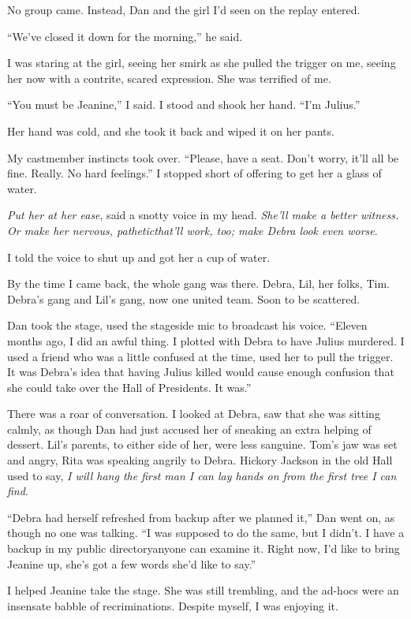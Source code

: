 No group came. Instead, Dan and the girl I'd seen on the replay
entered.

“We've closed it down for the morning,” he said.

I was staring at the girl, seeing her smirk as she pulled the
trigger on me, seeing her now with a contrite, scared expression.
She was terrified of me.

“You must be Jeanine,” I said. I stood and shook her hand. “I'm
Julius.”

Her hand was cold, and she took it back and wiped it on her pants.

My castmember instincts took over. “Please, have a seat. Don't
worry, it'll all be fine. Really. No hard feelings.” I stopped
short of offering to get her a glass of water.

\emph{Put her at her ease}, said a snotty voice in my head.
\emph{She'll make a better witness. Or make her nervous, pathetic{\dash}that'll work, too; make Debra look even worse}.

I told the voice to shut up and got her a cup of water.

By the time I came back, the whole gang was there. Debra, Lil, her
folks, Tim. Debra's gang and Lil's gang, now one united team. Soon
to be scattered.

Dan took the stage, used the stageside mic to broadcast his voice.
“Eleven months ago, I did an awful thing. I plotted with Debra to
have Julius murdered. I used a friend who was a little confused at
the time, used her to pull the trigger. It was Debra's idea that
having Julius killed would cause enough confusion that she could
take over the Hall of Presidents. It was.”

There was a roar of conversation. I looked at Debra, saw that she
was sitting calmly, as though Dan had just accused her of sneaking
an extra helping of dessert. Lil's parents, to either side of her,
were less sanguine. Tom's jaw was set and angry, Rita was speaking
angrily to Debra. Hickory Jackson in the old Hall used to say,
\emph{I will hang the first man I can lay hands on from the first tree I can find}.

“Debra had herself refreshed from backup after we planned it,” Dan
went on, as though no one was talking. “I was supposed to do the
same, but I didn't. I have a backup in my public directory{\dash}anyone
can examine it. Right now, I'd like to bring Jeanine up, she's got
a few words she'd like to say.”

I helped Jeanine take the stage. She was still trembling, and the
ad-hocs were an insensate babble of recriminations. Despite myself,
I was enjoying it.

